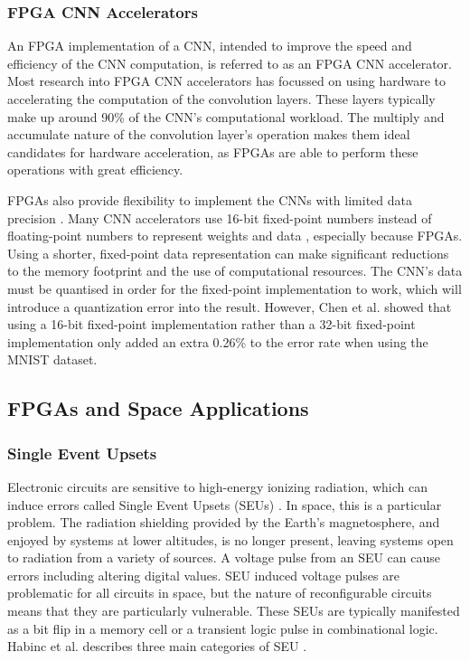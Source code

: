 \documentclass[12pt]{article}
\begin{document}
\subsubsection{FPGA CNN Accelerators}
\label{sec:Background-FpgaCnnImpl-Accel}


An FPGA implementation of a CNN, intended to improve the speed and efficiency of the CNN computation, is referred to as an FPGA CNN accelerator. Most research into FPGA CNN accelerators has focussed on using hardware to accelerating the computation of the convolution layers. These layers typically make up around 90\% of the CNN's computational workload. The multiply and accumulate nature of the convolution layer's operation makes them ideal candidates for hardware acceleration, as FPGAs are able to perform these operations with great efficiency. 

FPGAs also provide flexibility to implement the CNNs with limited data precision \cite{SudaFpgaAccelerator}. Many CNN accelerators use 16-bit fixed-point numbers instead of floating-point numbers to represent weights and data \cite{ZhangFpgaAccelerator}\cite{ChenFpgaAccelerator}\cite{FarabetFpgaAccelerator}, especially because FPGAs. Using a shorter, fixed-point data representation can make significant reductions to the memory footprint and the use of computational resources. The CNN's data must be quantised in order for the fixed-point implementation to work, which will introduce a quantization error into the result. However, Chen et al. showed that using a 16-bit fixed-point implementation rather than a 32-bit fixed-point implementation only added an extra 0.26\% to the error rate when using the MNIST dataset.

\subsection{FPGAs and Space Applications}
\label{sec:Background-FPGAsAndSpaceApplications}

\subsubsection{Single Event Upsets}
\label{sec:Background-FPGAsAndSpaceApplications-SEUs}

Electronic circuits are sensitive to high-energy ionizing radiation, which can induce errors called Single Event Upsets (SEUs) \cite{SeuTutorial}. In space, this is a particular problem. The radiation shielding provided by the Earth's magnetosphere, and enjoyed by systems at lower altitudes, is no longer present, leaving systems open to radiation from a  variety of sources. A voltage pulse from an SEU can cause errors including altering digital values. SEU induced voltage pulses are problematic for all circuits in space, but the nature of reconfigurable circuits means that they are particularly vulnerable. These SEUs are typically manifested as a bit flip in a memory cell or a transient logic pulse in combinational logic. Habinc et al. describes three main categories of SEU \cite{SuitabilityGaisler}.
\end{document}
